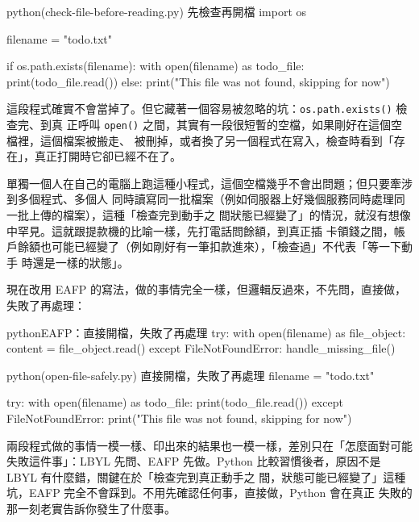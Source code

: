 \begin{example}{python}{(check-file-before-reading.py) 先檢查再開檔}
import os

filename = "todo.txt"

if os.path.exists(filename):
    with open(filename) as todo_file:
        print(todo_file.read())
else:
    print("This file was not found, skipping for now")
\end{example}


這段程式確實不會當掉了。但它藏著一個容易被忽略的坑：\texttt{os.path.exists()} 檢查完、到真
正呼叫 \texttt{open()} 之間，其實有一段很短暫的空檔，如果剛好在這個空檔裡，這個檔案被搬走、
被刪掉，或者換了另一個程式在寫入，檢查時看到「存在」，真正打開時它卻已經不在了。

單獨一個人在自己的電腦上跑這種小程式，這個空檔幾乎不會出問題；但只要牽涉到多個程式、多個人
同時讀寫同一批檔案（例如伺服器上好幾個服務同時處理同一批上傳的檔案），這種「檢查完到動手之
間狀態已經變了」的情況，就沒有想像中罕見。這就跟提款機的比喻一樣，先打電話問餘額，到真正插
卡領錢之間，帳戶餘額也可能已經變了（例如剛好有一筆扣款進來），「檢查過」不代表「等一下動手
時還是一樣的狀態」。

現在改用 EAFP 的寫法，做的事情完全一樣，但邏輯反過來，不先問，直接做，失敗了再處理：

\begin{code}{python}{EAFP：直接開檔，失敗了再處理}
try:
    with open(filename) as file_object:
        content = file_object.read()
except FileNotFoundError:
    handle_missing_file()
\end{code}

\begin{example}{python}{(open-file-safely.py) 直接開檔，失敗了再處理}
filename = "todo.txt"

try:
    with open(filename) as todo_file:
        print(todo_file.read())
except FileNotFoundError:
    print("This file was not found, skipping for now")
\end{example}


兩段程式做的事情一模一樣、印出來的結果也一模一樣，差別只在「怎麼面對可能失敗這件事」：LBYL
先問、EAFP 先做。Python 比較習慣後者，原因不是 LBYL 有什麼錯，關鍵在於「檢查完到真正動手之
間，狀態可能已經變了」這種坑，EAFP 完全不會踩到。不用先確認任何事，直接做，Python 會在真正
失敗的那一刻老實告訴你發生了什麼事。

